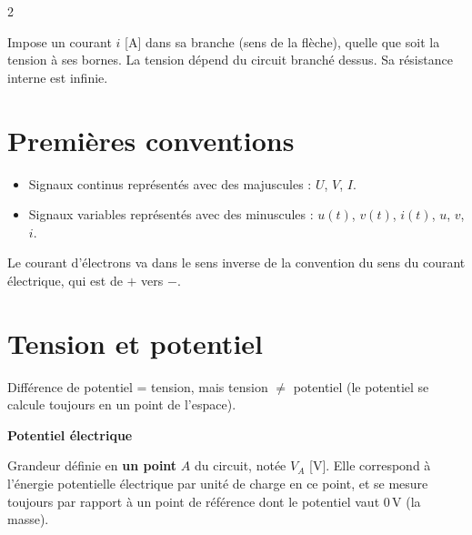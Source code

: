 \documentclass[a4paper,9pt]{extarticle}
\begin{document}
\begin{multicols}{2}
\begin{definition}
Impose un courant $i$ [A] dans sa branche (sens de la flèche), quelle que soit la tension à ses bornes. La tension dépend du circuit branché dessus. Sa résistance interne est infinie.

\end{definition}


\section{Premières conventions}


\begin{important}

\begin{itemize}

\item Signaux continus représentés avec des majuscules : $U$, $V$, $I$.

\item Signaux variables représentés avec des minuscules : $u(t)$, $v(t)$, $i(t)$, $u$, $v$, $i$.

\end{itemize}

\end{important}


\begin{warning}

Le courant d'électrons va dans le sens inverse de la convention du sens du courant électrique, qui est de $+$ vers $-$.

\end{warning}


\columnbreak


\section{Tension et potentiel}


\begin{warning}

Différence de potentiel = tension, mais tension $\neq$ potentiel (le potentiel se calcule toujours en un point de l'espace).

\end{warning}


\begin{definition}

\textbf{Potentiel électrique}

Grandeur définie en \textbf{un point} $A$ du circuit, notée $V_A$ [V]. Elle correspond à l'énergie potentielle électrique par unité de charge en ce point, et se mesure toujours par rapport à un point de référence dont le potentiel vaut $0\,\text{V}$ (la masse).


\end{definition}
\end{multicols}
\end{document}
